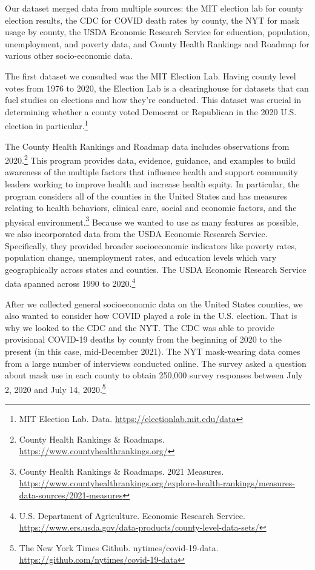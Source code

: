 \documentclass[
]{article}
\begin{document}
Our dataset merged data from multiple sources: the MIT election lab for county election results, the CDC for COVID death rates by county, the NYT for mask usage by county, the USDA Economic Research Service for education, population, unemployment, and poverty data, and County Health Rankings and Roadmap for various other socio-economic data.

The first dataset we consulted was the MIT Election Lab. Having county level votes from 1976 to 2020, the Election Lab is a clearinghouse for datasets that can fuel studies on elections and how they're conducted. This dataset was crucial in determining whether a county voted Democrat or Republican in the 2020 U.S. election in particular.\footnote{MIT Election Lab. Data. \url{https://electionlab.mit.edu/data}}

The County Health Rankings and Roadmap data includes observations from 2020.\footnote{County Health Rankings \& Roadmaps. \url{https://www.countyhealthrankings.org/}} This program provides data, evidence, guidance, and examples to build awareness of the multiple factors that influence health and support community leaders working to improve health and increase health equity. In particular, the program considers all of the counties in the United States and has measures relating to health behaviors, clinical care, social and economic factors, and the physical environment.\footnote{County Health Rankings \& Roadmaps. 2021 Measures. \url{https://www.countyhealthrankings.org/explore-health-rankings/measures-data-sources/2021-measures}} Because we wanted to use as many features as possible, we also incorporated data from the USDA Economic Research Service. Specifically, they provided broader socioeconomic indicators like poverty rates, population change, unemployment rates, and education levels which vary geographically across states and counties. The USDA Economic Research Service data spanned across 1990 to 2020.\footnote{U.S. Department of Agriculture. Economic Research Service. \url{https://www.ers.usda.gov/data-products/county-level-data-sets/}}

After we collected general socioeconomic data on the United States counties, we also wanted to consider how COVID played a role in the U.S. election. That is why we looked to the CDC and the NYT. The CDC was able to provide provisional COVID-19 deaths by county from the beginning of 2020 to the present (in this case, mid-December 2021). The NYT mask-wearing data comes from a large number of interviews conducted online. The survey asked a question about mask use in each county to obtain 250,000 survey responses between July 2, 2020 and July 14, 2020.\footnote{The New York Times Github. nytimes/covid-19-data. \url{https://github.com/nytimes/covid-19-data}}
\end{document}
